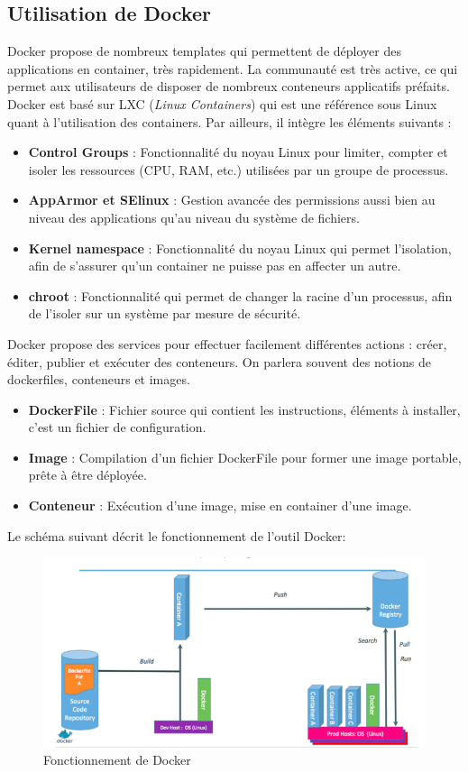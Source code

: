 \begin{onehalfspace}
\subsection{Utilisation de Docker}
Docker propose de nombreux templates qui permettent de déployer des applications en container, très rapidement. La communauté est très active, ce qui permet aux utilisateurs de disposer de nombreux conteneurs applicatifs préfaits.
Docker est basé sur LXC (\emph{Linux Containers}) qui est une référence sous Linux quant à l’utilisation des containers. Par ailleurs, il intègre les éléments suivants :
\begin{itemize}
\item \textbf{Control Groups} : Fonctionnalité du noyau Linux pour limiter, compter et isoler les ressources (CPU, RAM, etc.) utilisées par un groupe de processus.
\item \textbf{AppArmor et SElinux} : Gestion avancée des permissions aussi bien au niveau des applications qu’au niveau du système de fichiers.
\item \textbf{Kernel namespace} : Fonctionnalité du noyau Linux qui permet l’isolation, afin de s’assurer qu’un container ne puisse pas en affecter un autre.
\item \textbf{chroot} : Fonctionnalité qui permet de changer la racine d’un processus, afin de l’isoler sur un système par mesure de sécurité.
\end{itemize}

Docker propose des services pour effectuer facilement différentes actions : créer, éditer, publier et exécuter des conteneurs. On parlera souvent des notions de dockerfiles, conteneurs et  images.

\begin{itemize}
\item \textbf{DockerFile} : Fichier source qui contient les instructions, éléments à installer, c’est un fichier de configuration.
\item \textbf{Image} : Compilation d’un fichier DockerFile pour former une image portable, prête à être déployée.
\item \textbf{Conteneur} : Exécution d’une image, mise en container d’une image.
\end{itemize}


Le schéma suivant décrit le fonctionnement de l'outil Docker: 
\begin{figure}[H]
\centering
\includegraphics [scale=0.6]{chapitre2/assets/utilisation.png}
\caption{Fonctionnement de Docker}
\end{figure}

\end{onehalfspace}
\label{table:} %

